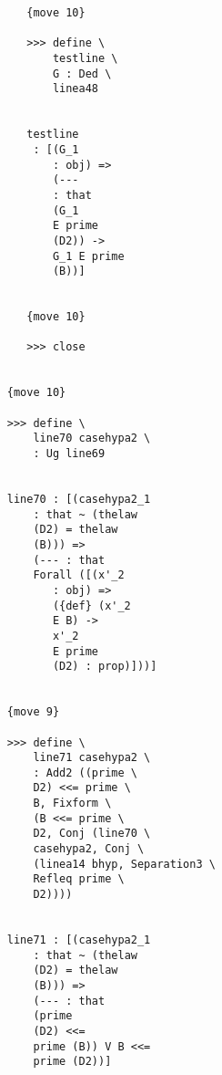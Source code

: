 \documentclass[12pt]{article}
\begin{document}
\begin{verbatim}
                                 {move 10}

                                 >>> define \
                                     testline \
                                     G : Ded \
                                     linea48


                                 testline 
                                  : [(G_1 
                                     : obj) => 
                                     (--- 
                                     : that 
                                     (G_1 
                                     E prime 
                                     (D2)) -> 
                                     G_1 E prime 
                                     (B))]


                                 {move 10}

                                 >>> close


                              {move 10}

                              >>> define \
                                  line70 casehypa2 \
                                  : Ug line69


                              line70 : [(casehypa2_1 
                                  : that ~ (thelaw 
                                  (D2) = thelaw 
                                  (B))) => 
                                  (--- : that 
                                  Forall ([(x'_2 
                                     : obj) => 
                                     ({def} (x'_2 
                                     E B) -> 
                                     x'_2 
                                     E prime 
                                     (D2) : prop)]))]


                              {move 9}

                              >>> define \
                                  line71 casehypa2 \
                                  : Add2 ((prime \
                                  D2) <<= prime \
                                  B, Fixform \
                                  (B <<= prime \
                                  D2, Conj (line70 \
                                  casehypa2, Conj \
                                  (linea14 bhyp, Separation3 \
                                  Refleq prime \
                                  D2))))


                              line71 : [(casehypa2_1 
                                  : that ~ (thelaw 
                                  (D2) = thelaw 
                                  (B))) => 
                                  (--- : that 
                                  (prime 
                                  (D2) <<= 
                                  prime (B)) V B <<= 
                                  prime (D2))]



\end{verbatim}
\end{document}
